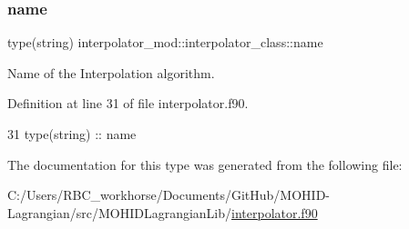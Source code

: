 \subsubsection{\texorpdfstring{name}{name}}
{\footnotesize\ttfamily type(string) interpolator\+\_\+mod\+::interpolator\+\_\+class\+::name\hspace{0.3cm}{\ttfamily [private]}}



Name of the Interpolation algorithm. 



Definition at line 31 of file interpolator.\+f90.


\begin{DoxyCode}
31         \textcolor{keywordtype}{type}(string) :: name
\end{DoxyCode}


The documentation for this type was generated from the following file\+:\begin{DoxyCompactItemize}
\item 
C\+:/\+Users/\+R\+B\+C\+\_\+workhorse/\+Documents/\+Git\+Hub/\+M\+O\+H\+I\+D-\/\+Lagrangian/src/\+M\+O\+H\+I\+D\+Lagrangian\+Lib/\mbox{\hyperlink{interpolator_8f90}{interpolator.\+f90}}\end{DoxyCompactItemize}
